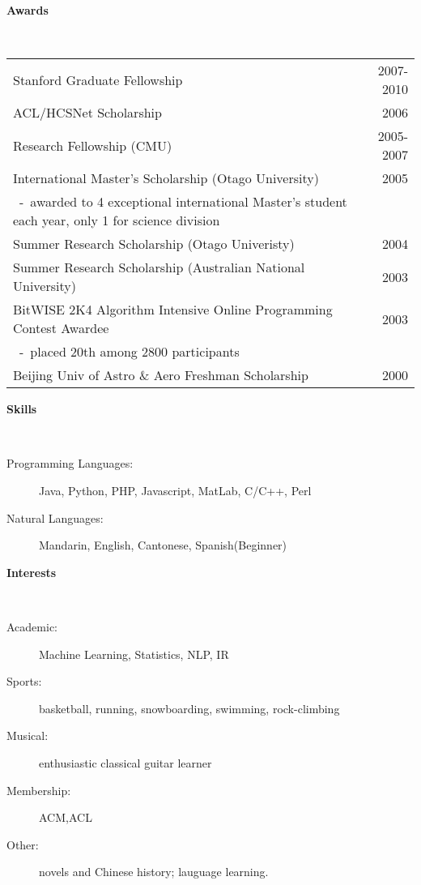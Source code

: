 \documentclass[letterpaper,11pt]{article}
\begin{document}
\pagebreak
\begin{large}\textbf{Awards}\end{large}\\
\begin{tabular*}{6.5in}{l@{\extracolsep{\fill}}r}
		Stanford Graduate Fellowship & 2007-2010\\
		ACL/HCSNet Scholarship & 2006\\
		Research Fellowship (CMU) & 2005-2007\\
		International Master's Scholarship (Otago University) & 2005\\
		\mbox{     -}\mbox{  }\small{awarded to 4 exceptional international Master's student each year, only 1 for science division} \\
		Summer Research Scholarship (Otago Univeristy) & 2004 \\
		Summer Research Scholarship (Australian National University) & 2003 \\
		BitWISE 2K4 Algorithm Intensive Online Programming Contest Awardee & 2003 \\
		\mbox{     -}\mbox{  }\small{placed 20th among 2800 participants} \\
		Beijing Univ of Astro \& Aero Freshman Scholarship & 2000\\
\end{tabular*}

\vspace{0.2in}
\begin{large}\textbf{Skills}\end{large}\\
\vspace{-0.2in}
\begin{description}
\item[Programming Languages:]
Java, Python, PHP, Javascript, MatLab, C/C++, Perl
\item[Natural Languages:]
Mandarin, English, Cantonese, Spanish(Beginner)
\end{description}

\vspace{0.2in}
\begin{large}\textbf{Interests}\end{large}\\
\vspace{-0.2in}
\begin{description}
\item[Academic:] Machine Learning, Statistics, NLP, IR
\item[Sports:] basketball, running, snowboarding, swimming, rock-climbing
\item[Musical:] enthusiastic classical guitar learner
\item[Membership:] ACM,ACL
\item[Other:] novels and Chinese history; lauguage learning.
\end{description}
\end{document}
